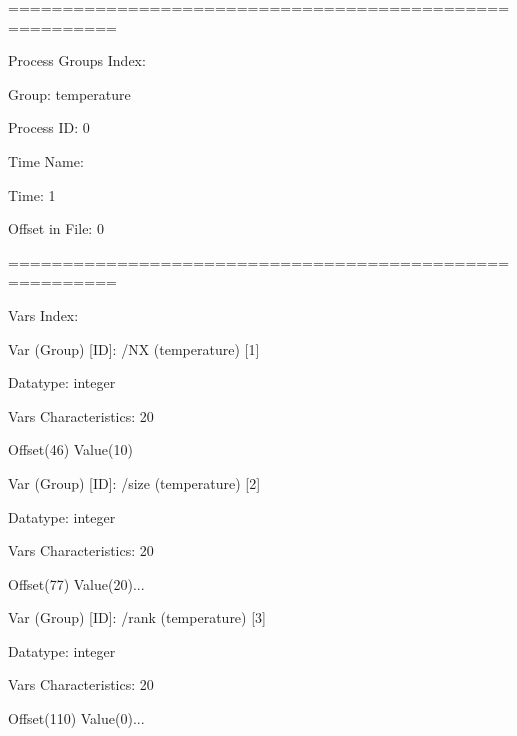 \vspace{10pt}
========================================================

\vspace{10pt}
Process Groups Index:

\vspace{10pt}
Group: temperature

\vspace{10pt}
\parindent=28pt
Process ID: 0

\vspace{10pt}
Time Name:

\vspace{10pt}
\parindent=57pt
Time: 1

\vspace{10pt}
\parindent=28pt
Offset in File: 0

\vspace{10pt}
\parindent=0pt
========================================================

\vspace{10pt}
Vars Index:

\vspace{10pt}
Var (Group) [ID]: /NX (temperature) [1]

\vspace{10pt}
\parindent=28pt
Datatype: integer

\vspace{10pt}
Vars Characteristics: 20

\vspace{10pt}
\parindent=0pt
Offset(46)              Value(10)

\vspace{10pt}
Var (Group) [ID]: /size (temperature) [2]

\vspace{10pt}
\parindent=28pt
Datatype: integer

\vspace{10pt}
Vars Characteristics: 20

\vspace{10pt}
\parindent=0pt
Offset(77)              Value(20)...

\vspace{22pt}
Var (Group) [ID]: /rank (temperature) [3]

\vspace{10pt}
\parindent=28pt
Datatype: integer

\vspace{10pt}
Vars Characteristics: 20

\vspace{10pt}
\parindent=86pt
Offset(110)             Value(0)...

